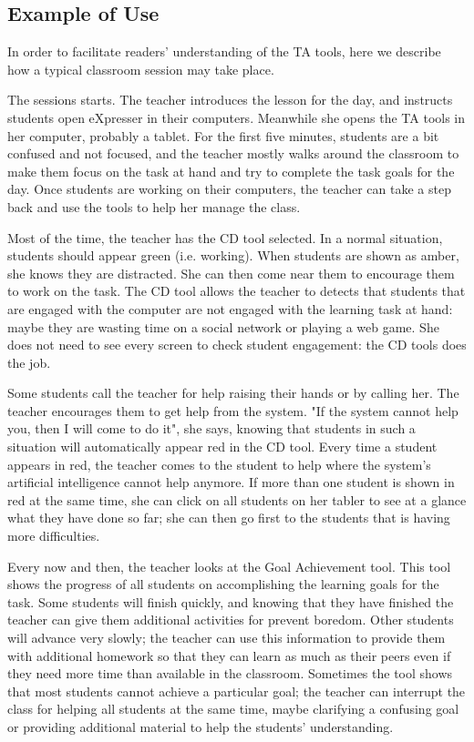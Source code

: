 \subsection{Example of Use}
\label{sec:example-use}

In order to facilitate readers' understanding of the TA tools, here we 
describe how a typical classroom session may take place. 

The sessions starts. The teacher introduces the lesson for the day,
and instructs students open eXpresser in their computers. Meanwhile
she opens the TA tools in her computer, probably a tablet. For the
first five minutes, students are a bit confused and not focused, and
the teacher mostly walks around the classroom to make them focus on
the task at hand and try to complete the task goals for the day. Once
students are working on their computers, the teacher can take a step
back and use the tools to help her manage the class.

Most of the time, the teacher has the CD tool selected. In a normal
situation, students should appear green (i.e. working). When students
are shown as amber, she knows they are distracted. She can then come
near them to encourage them to work on the task. The CD tool allows
the teacher to detects that students that are engaged with the
computer are not engaged with the learning task at hand: maybe they
are wasting time on a social network or playing a web game. She does
not need to see every screen to check student engagement: the CD tools
does the job.

Some students call the teacher for help raising their hands or by
calling her. The teacher encourages them to get help from the system.
"If the system cannot help you, then I will come to do it", she says,
knowing that students in such a situation will automatically appear
red in the CD tool. Every time a student appears in red, the teacher
comes to the student to help where the system's artificial
intelligence cannot help anymore. If more than one student is shown in
red at the same time, she can click on all students on her tabler to
see at a glance what they have done so far; she can then go first to
the students that is having more difficulties.

Every now and then, the teacher looks at the Goal Achievement tool.
This tool shows the progress of all students on accomplishing the
learning goals for the task. Some students will finish quickly, and
knowing that they have finished the teacher can give them additional
activities for prevent boredom. Other students will advance very
slowly; the teacher can use this information to provide them with
additional homework so that they can learn as much as their peers even
if they need more time than available in the classroom. Sometimes the
tool shows that most students cannot achieve a particular goal; the
teacher can interrupt the class for helping all students at the same
time, maybe clarifying a confusing goal or providing additional
material to help the students' understanding.


